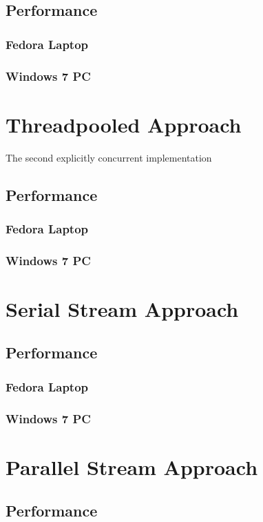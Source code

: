 \documentclass[]{report}
\begin{document}
\subsection{Performance}
\subsubsection{Fedora Laptop}
\subsubsection{Windows 7 PC}
 
\section{Threadpooled Approach}
The second explicitly concurrent implementation
\subsection{Performance}
\subsubsection{Fedora Laptop}
\subsubsection{Windows 7 PC}

\section{Serial Stream Approach}
\subsection{Performance}
\subsubsection{Fedora Laptop}
\subsubsection{Windows 7 PC}

\section{Parallel Stream Approach}
\subsection{Performance}
\end{document}
